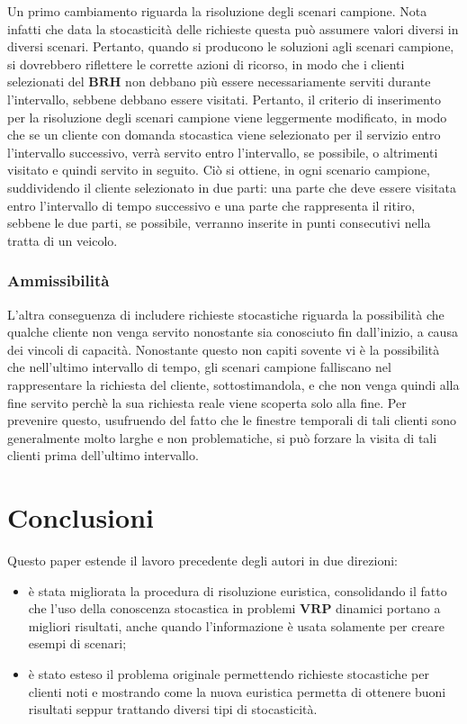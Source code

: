 \documentclass[
]{article}
\providecommand{\tightlist}{%
  \setlength{\itemsep}{0pt}\setlength{\parskip}{0pt}}
\begin{document}
Un primo cambiamento riguarda la risoluzione degli scenari campione.
Nota infatti che data la stocasticità delle richieste questa può
assumere valori diversi in diversi scenari. Pertanto, quando si
producono le soluzioni agli scenari campione, si dovrebbero riflettere
le corrette azioni di ricorso, in modo che i clienti selezionati del
{\(\mathbf{BRH}\)} non debbano più essere necessariamente serviti
durante l'intervallo, sebbene debbano essere visitati. Pertanto, il
criterio di inserimento per la risoluzione degli scenari campione viene
leggermente modificato, in modo che se un cliente con domanda stocastica
viene selezionato per il servizio entro l'intervallo successivo, verrà
servito entro l'intervallo, se possibile, o altrimenti visitato e quindi
servito in seguito. Ciò si ottiene, in ogni scenario campione,
suddividendo il cliente selezionato in due parti: una parte che deve
essere visitata entro l'intervallo di tempo successivo e una parte che
rappresenta il ritiro, sebbene le due parti, se possibile, verranno
inserite in punti consecutivi nella tratta di un veicolo.

\hypertarget{ammissibilituxe0}{%
\subsubsection{Ammissibilità}\label{ammissibilituxe0}}

L'altra conseguenza di includere richieste stocastiche riguarda la
possibilità che qualche cliente non venga servito nonostante sia
conosciuto fin dall'inizio, a causa dei vincoli di capacità. Nonostante
questo non capiti sovente vi è la possibilità che nell'ultimo intervallo
di tempo, gli scenari campione falliscano nel rappresentare la richiesta
del cliente, sottostimandola, e che non venga quindi alla fine servito
perchè la sua richiesta reale viene scoperta solo alla fine. Per
prevenire questo, usufruendo del fatto che le finestre temporali di tali
clienti sono generalmente molto larghe e non problematiche, si può
forzare la visita di tali clienti prima dell'ultimo
intervallo.

\hypertarget{conclusioni}{%
\section{Conclusioni}\label{conclusioni}}

Questo paper estende il lavoro precedente degli autori in due direzioni:

\begin{itemize}
\tightlist
\item
  è stata migliorata la procedura di risoluzione euristica, consolidando
  il fatto che l'uso della conoscenza stocastica in problemi
  {\(\mathbf{VRP}\)} dinamici portano a migliori risultati, anche quando
  l'informazione è usata solamente per creare esempi di scenari;
\item
  è stato esteso il problema originale permettendo richieste stocastiche
  per clienti noti e mostrando come la nuova euristica permetta di
  ottenere buoni risultati seppur trattando diversi tipi di
  stocasticità.
\end{itemize}
\end{document}
